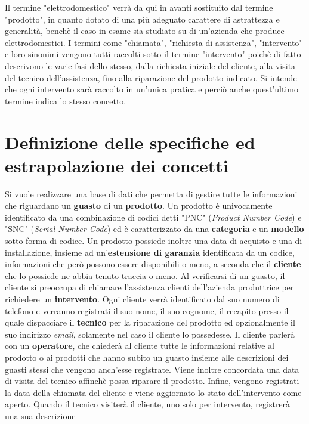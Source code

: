 \documentclass[a4paper, 12pt]{report}
\begin{document}
Il termine "elettrodomestico" verrà da qui in avanti sostituito dal termine "prodotto", in quanto dotato di una più adeguato carattere di astrattezza
e generalità, benchè il caso in esame sia studiato su di un'azienda che produce elettrodomestici. I termini come "chiamata", "richiesta di
assistenza", "intervento" e loro sinonimi vengono tutti raccolti sotto il termine "intervento" poichè di fatto descrivono le varie fasi dello
stesso, dalla richiesta iniziale del cliente, alla visita del tecnico dell'assistenza, fino alla riparazione del prodotto indicato. Si intende
che ogni intervento sarà raccolto in un'unica pratica e perciò anche quest'ultimo termine indica lo stesso concetto.

\section{Definizione delle specifiche ed estrapolazione dei concetti}
Si vuole realizzare una base di dati che permetta di gestire tutte le informazioni che riguardano un \textbf{guasto} di un \textbf{prodotto}.
Un prodotto è univocamente identificato da una combinazione di codici detti "PNC" (\textit{Product Number Code}) e "SNC" (\textit{Serial Number Code}) ed è caratterizzato
da una \textbf{categoria} e un \textbf{modello} sotto forma di codice. Un prodotto possiede inoltre una data di acquisto e una di installazione, insieme ad 
un'\textbf{estensione di garanzia} identificata da un codice, informazioni che però possono essere disponibili o meno, a seconda che il \textbf{cliente}
che lo possiede ne abbia tenuto traccia o meno.\newline
Al verificarsi di un guasto, il cliente si preoccupa di chiamare l'assistenza clienti dell'azienda produttrice per richiedere un
\textbf{intervento}. Ogni cliente verrà identificato dal suo numero di telefono e verranno registrati il suo nome, il suo cognome,
il recapito presso il quale dispacciare il \textbf{tecnico} per la riparazione del prodotto ed opzionalmente il suo indirizzo \textit{email},
solamente nel caso il cliente lo possedesse.\newline
Il cliente parlerà con un \textbf{operatore}, che chiederà al cliente tutte le informazioni relative al prodotto o ai prodotti
che hanno subito un guasto insieme alle descrizioni dei guasti stessi che vengono anch'esse registrate. Viene inoltre concordata una data di
visita del tecnico affinchè possa riparare il prodotto. Infine, vengono registrati la data della chiamata del cliente e viene
aggiornato lo stato dell'intervento come aperto. Quando il tecnico visiterà il cliente, uno solo per intervento, registrerà una sua descrizione
\end{document}
